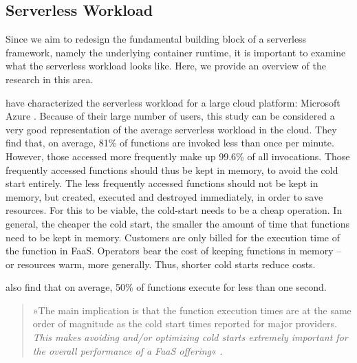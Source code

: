 \subsection{Serverless Workload}
\label{section:serverless_workload}

Since we aim to redesign the fundamental building block of a serverless framework, namely the underlying container runtime, it is important to examine what the serverless workload looks like. Here, we provide an overview of the research in this area.

\citeauthor{Shahrad2020} have characterized the serverless workload for a large cloud platform: Microsoft Azure \cite{Shahrad2020}. Because of their large number of users, this study can be considered a very good representation of the average serverless workload in the cloud.
They find that, on average, 81\% of functions are invoked less than once per minute. However, those accessed more frequently make up 99.6\% of all invocations.
Those frequently accessed functions should thus be kept in memory, to avoid the cold start entirely. The less frequently accessed functions should not be kept in memory, but created, executed and destroyed immediately, in order to save resources. For this to be viable, the cold-start needs to be a cheap operation. In general, the cheaper the cold start, the smaller the amount of time that functions need to be kept in memory.
Customers are only billed for the execution time of the function in FaaS. Operators bear the cost of keeping functions in memory -- or resources warm, more generally. Thus, shorter cold starts reduce costs.

\citeauthor{Shahrad2020} also find that on average, 50\% of functions execute for less than one second.

\begin{quote}
    »The main implication is that the function execution times are at the same order of magnitude as the cold start times reported for major providers. \emph{This makes avoiding and/or optimizing cold starts extremely important for the overall performance of a FaaS offering}« \cite{Shahrad2020}.
\end{quote}


